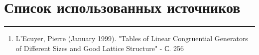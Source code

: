 \documentclass[a4paper, 14pt]{extarticle}
\begin{document}




\newpage
\section{Список использованных источников}\vspace{-20pt}\rule{\linewidth}{0.1mm}
\begin{enumerate}
  \item \label{item:source1} L'Ecuyer, Pierre (January 1999). "Tables of Linear Congruential Generators of Different Sizes and Good Lattice Structure" - С. 256
\end{enumerate}
\end{document}
